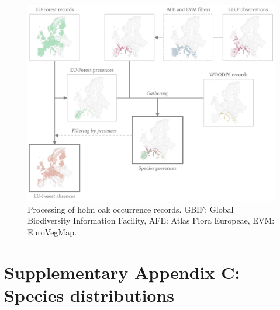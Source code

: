 \documentclass[11pt,]{article}
\begin{document}
\begin{landscape}
\begin{figure}[htbp]

{\centering \includegraphics{figs/files/occurrence_processing} 

}

\caption{Processing of holm oak occurrence records. GBIF: Global Biodiversity Information Facility, AFE: Atlas Flora Europeae, EVM: EuroVegMap.}\label{fig:occ_processing}
\end{figure}
\end{landscape}

\newpage

\newpage

\hypertarget{appendixC}{%
\section{Supplementary Appendix C: Species
distributions}\label{appendixC}}

\renewcommand*\thetable{C.\arabic{table}}
\renewcommand*\thefigure{C.\arabic{figure}}

\setcounter{figure}{0}
\setcounter{table}{0}

\renewcommand*{\thepage}{C--\arabic{page}}
\end{document}
